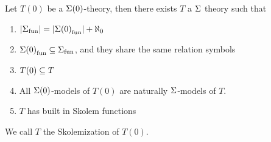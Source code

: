 \begin{prop}[Skolemization]
    Let $T(0)$ be a $\Sigma(0)$-theory, 
    then there exists $T$ a $\Sigma$ theory such that
    \begin{enumerate}
        \item $|{\Sigma}_\mathrm{fun}| = |{\Sigma(0)}_\mathrm{fun}| + \aleph_0$
        \item ${\Sigma(0)}_\mathrm{fun} \subseteq {\Sigma}_\mathrm{fun}$, 
            and they share the same relation symbols
        \item $T(0) \subseteq T$
        \item All $\Sigma(0)$-models of $T(0)$ are naturally $\Sigma$-models of $T$.
        \item $T$ has built in Skolem functions
    \end{enumerate}
    We call $T$ the Skolemization of $T(0)$.
\end{prop}
